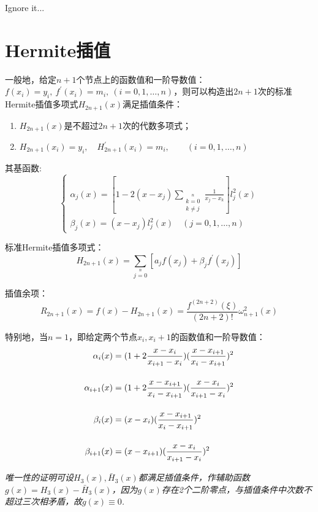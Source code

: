 Ignore it...


\newpage
\section{Hermite插值}
一般地，给定$n+1$个节点上的函数值和一阶导数值：$f(x_i)=y_i,\ f^{\prime}(x_i)=m_i,\ (i=0,1,\dots,n)$，则可以构造出$2n+1$次的标准Hermite插值多项式$H_{2n+1}(x)$满足插值条件：
\begin{enumerate}
	\item $H_{2n+1}(x)$是不超过$2n+1$次的代数多项式；
	\item $H_{2n+1}(x_i) = y_i,\quad H^{\prime}_{2n+1}(x_i) = m_i,\qquad (i=0,1,\dots,n)$
\end{enumerate}

其基函数:	
\begin{equation}
	\begin{cases}
	\alpha_j(x)= [1-2(x-x_j)\sum\limits_{\substack{k=0\\ k\neq j}}\limits^n\frac{1}{x_j - x_k}]l_j^2(x)\\
	\beta_j(x)= (x-x_j)l_j^2(x)\quad (j=0,1,\dots,n)
	\end{cases}
\end{equation}

标准Hermite插值多项式：
\begin{equation}
H_{2n+1}(x) = \sum\limits_{j=0}\limits^n [a_j f(x_j) + \beta_j f^{\prime}(x_j)]
\end{equation}

插值余项：
\begin{equation}
R_{2n+1}(x) = f(x) - H_{2n+1}(x) = \frac{f^{(2n+2)}(\xi)}{(2n+2)!}\omega_{n+1}^2(x)
\end{equation}

特别地，当$n=1$，即给定两个节点$x_i,x_i+1$的函数值和一阶导数值：
\begin{align}
\alpha_i(x) &= (1+2\frac{x-x_i}{x_{i+1}-x_i})(\frac{x-x_{i+1}}{x_i - x_{i+1}})^2 \notag 
\\[4mm]
\alpha_{i+1}(x) &= (1+2\frac{x-x_{i+1}}{x_i-x_{i+1}})(\frac{x-x_i}{x_{i+1} - x_i})^2 \notag 
\\[4mm]
\beta_i(x) &= (x-x_i)(\frac{x-x_{i+1}}{x_i-x_{i+1}})^2 \notag 
\\[4mm]
\beta_{i+1}(x) &= (x-x_{i+1})(\frac{x-x_i}{x_{i+1}-x_i})^2 \notag
\end{align}

{\em 唯一性的证明可设$H_3(x), \bar{H}_3(x)$都满足插值条件，作辅助函数$g(x)=H_3(x) - \bar{H}_3(x)$，因为$g(x)$存在2个二阶零点，与插值条件中次数不超过三次相矛盾，故$g(x) \equiv 0$.}


